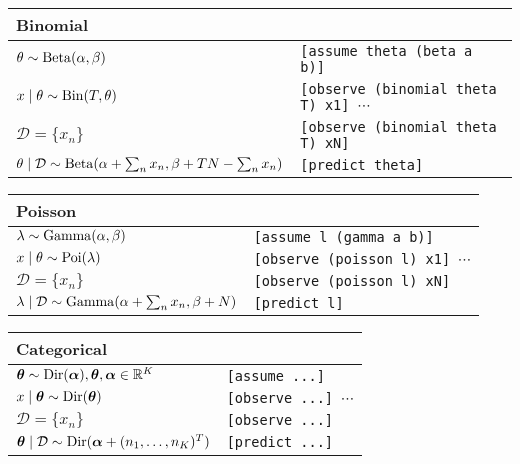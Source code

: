 \begin{table}[h]
\begin{tabular}{ll}
\toprule
Binomial & \\
\midrule
$\theta \sim \operatorname{Beta}(\alpha, \beta)$													& \texttt{[assume theta (beta a b)]} \\
$x \mid \theta \sim \operatorname{Bin}(T, \theta)$												& \texttt{[observe (binomial theta T) x1] $\cdots$} \\
$\mathcal D = \{x_n\}$																& \texttt{[observe (binomial theta T) xN]} \\
$\theta \mid \mathcal D \sim \operatorname{Beta}(\alpha + \sum_n x_n, \beta + TN - \sum_n x_n)$	& \texttt{[predict theta]} \\
\bottomrule
\end{tabular}
\end{table}

\begin{table}[h]
\begin{tabular}{ll}
\toprule
Poisson & \\
\midrule
$\lambda \sim \operatorname{Gamma}(\alpha, \beta)$											& \texttt{[assume l (gamma a b)]} \\
$x \mid \theta \sim \operatorname{Poi}(\lambda)$													& \texttt{[observe (poisson l) x1] $\cdots$} \\
$\mathcal D = \{x_n\}$																& \texttt{[observe (poisson l) xN]} \\
$\lambda \mid \mathcal D \sim \operatorname{Gamma}(\alpha + \sum_n x_n, \beta + N)$			& \texttt{[predict l]} \\
\bottomrule
\end{tabular}
\end{table}

\begin{table}[h]
\begin{tabular}{ll}
\toprule
Categorical & \\
\midrule
$\boldsymbol{\mathbf{\theta}} \sim \operatorname{Dir}(\boldsymbol{\mathbf{\alpha}}), \boldsymbol{\mathbf{\theta}},\boldsymbol{\mathbf{\alpha}} \in \mathbb R^K$			& \texttt{[assume ...]} \\
$x \mid \boldsymbol{\mathbf{\theta}} \sim \operatorname{Dir}(\boldsymbol{\mathbf{\theta}})$											& \texttt{[observe ...] $\cdots$} \\
$\mathcal D = \{x_n\}$																& \texttt{[observe ...]} \\
$\boldsymbol{\mathbf{\theta}} \mid \mathcal D \sim \operatorname{Dir}(\boldsymbol{\mathbf{\alpha}} + (n_1, \dotsc, n_K)^T)$			& \texttt{[predict ...]} \\
\bottomrule
\end{tabular}
\end{table}

